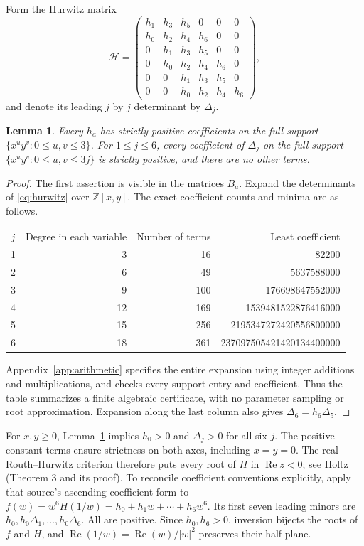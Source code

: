 \documentclass[11pt]{article}
\newtheorem{lemma}[theorem]{Lemma}
\DeclareMathOperator{\Ree}{Re}
\begin{document}
Form the Hurwitz matrix
\begin{equation}\label{eq:hurwitz}
 \mathcal H=\left(\begin{array}{cccccc}
 h_1&h_3&h_5&0&0&0\\
 h_0&h_2&h_4&h_6&0&0\\
 0&h_1&h_3&h_5&0&0\\
 0&h_0&h_2&h_4&h_6&0\\
 0&0&h_1&h_3&h_5&0\\
 0&0&h_0&h_2&h_4&h_6
 \end{array}\right),
\end{equation}
and denote its leading $j$ by $j$ determinant by $\Delta_j$.

\begin{lemma}\label{lem:positive}
Every $h_a$ has strictly positive coefficients on the full support
$\{x^uy^v:0\le u,v\le3\}$. For $1\le j\le6$, every coefficient
of $\Delta_j$ on the full support
$\{x^uy^v:0\le u,v\le3j\}$ is strictly positive, and there are
no other terms.
\end{lemma}

\begin{proof}
The first assertion is visible in the matrices $B_a$.
Expand the determinants of \eqref{eq:hurwitz} over $\mathbb Z[x,y]$.
The exact coefficient counts and minima are as follows.
\begin{center}
\begin{tabular}{crrr}
$j$ & Degree in each variable & Number of terms & Least coefficient\\
1&3 &16 &82200\\
2&6 &49 &5637588000\\
3&9 &100&176698647552000\\
4&12&169&1539481522876416000\\
5&15&256&2195347272420556800000\\
6&18&361&237097505421420134400000\\
\end{tabular}
\end{center}
Appendix~\ref{app:arithmetic} specifies the entire expansion using
integer additions and multiplications, and checks every support entry
and coefficient. Thus the table summarizes a finite algebraic
certificate, with no parameter sampling or root approximation.
Expansion along the last column also gives
$\Delta_6=h_6\Delta_5$.
\end{proof}

For $x,y\ge0$, Lemma~\ref{lem:positive} implies $h_0>0$ and
$\Delta_j>0$ for all six $j$. The positive constant terms ensure
strictness on both axes, including $x=y=0$.
The real Routh--Hurwitz criterion therefore puts every root of $H$
in $\Ree z<0$; see Holtz \cite{holtz2003} (Theorem 3 and its proof).
To reconcile coefficient conventions explicitly, apply that source's
ascending-coefficient form to
$f(w)=w^6H(1/w)=h_0+h_1w+\cdots+h_6w^6$.
Its first seven leading minors are
$h_0,h_0\Delta_1,\ldots,h_0\Delta_6$.
All are positive. Since $h_0,h_6>0$, inversion bijects the roots of
$f$ and $H$, and $\Ree(1/w)=\Ree(w)/|w|^2$ preserves their half-plane.
\end{document}

